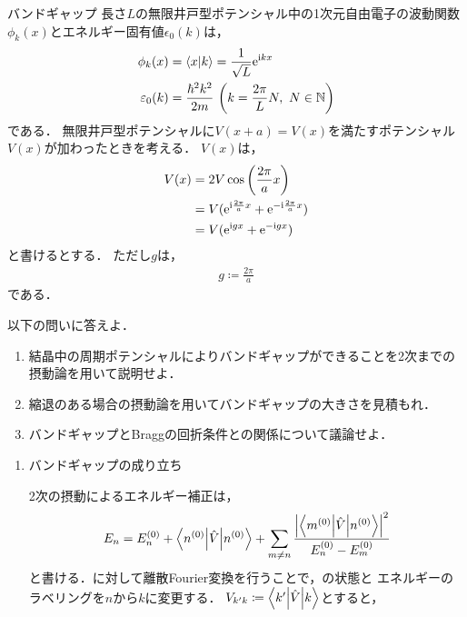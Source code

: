 \documentclass{report}
\begin{document}
  \begin{myex}{バンドギャップ}{}
    長さ$L$の無限井戸型ポテンシャル中の1次元自由電子の波動関数$\phi_k(x)$とエネルギー固有値$\epsilon_0(k)$は，
    \begin{align}
      \phi_k(x) &= \braket{x}{k} = \frac{1}{\sqrt{L}}\mathrm{e}^{\mathrm{i} kx} \\ 
      \varepsilon_0(k) &= \frac{\hbar^2k^2}{2m}\ \qty(k = \frac{2\pi}{L}N,\ N\in\mathbb{N})
    \end{align}
    である．
    無限井戸型ポテンシャルに$V(x + a) = V(x)$を満たすポテンシャル$V(x)$が加わったときを考える．
    $V(x)$は，
    \begin{align}
      V(x)& = 2V\cos\qty(\frac{2\pi}{a}x)\\
      & = V(\mathrm{e}^{\mathrm{i}\frac{2\pi}{a}x} + \mathrm{e}^{-\mathrm{i}\frac{2\pi}{a}x})\\
      & = V(\mathrm{e}^{\mathrm{i} gx} + \mathrm{e}^{-\mathrm{i} gx})
    \end{align}
    と書けるとする．
    ただし$g$は，
    \begin{align}
      g\coloneqq \frac{2\pi}{a}
    \end{align}
    である．
    \par
    以下の問いに答えよ．
    \begin{enumerate}
      \item 結晶中の周期ポテンシャルによりバンドギャップができることを2次までの摂動論を用いて説明せよ．
      \item 縮退のある場合の摂動論を用いてバンドギャップの大きさを見積もれ．
      \item バンドギャップとBraggの回折条件との関係について議論せよ．
    \end{enumerate}
    \tcblower
    \begin{enumerate}
      \item バンドギャップの成り立ち \par
        2次の摂動によるエネルギー補正は，
        \begin{align}
          E_n = E_n^{(0)} + \mel**{n^{(0)}}{\hat{V}}{n^{(0)}} + \sum_{m\neq n}\frac{\abs{\mel**{m^{(0)}}{\hat{V}}{n^{(0)}}}^2}{E_n^{(0)} - E_m^{(0)}} \label{2nd-order-perturbation-eigenvalue-re}
        \end{align}
        と書ける．に対して離散Fourier変換を行うことで，の状態と
        エネルギーのラベリングを$n$から$k$に変更する．
        $V_{k'k} \coloneqq \mel**{k'}{\hat{V}}{k}$とすると，
        \begin{align}

\end{align}
\end{enumerate}
\end{myex}
\end{document}
